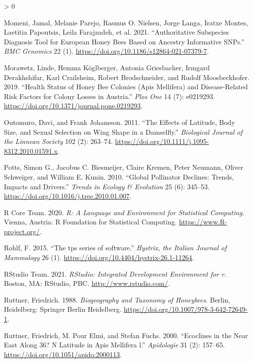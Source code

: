 \documentclass[
]{article}
\newlength{\cslhangindent}
\newenvironment{CSLReferences}[2] %
 {%
  \setlength{\parindent}{0pt}
  \ifodd #1 \everypar{\setlength{\hangindent}{\cslhangindent}}\ignorespaces\fi
  \ifnum #2 > 0
  \setlength{\parskip}{#2\baselineskip}
  \fi
 }%
 {}
\begin{document}
\begin{CSLReferences}{1}{0}
\leavevmode\hypertarget{ref-momeni2021}{}%
Momeni, Jamal, Melanie Parejo, Rasmus O. Nielsen, Jorge Langa, Iratxe Montes, Laetitia Papoutsis, Leila Farajzadeh, et al. 2021. {``Authoritative Subspecies Diagnosis Tool for European Honey Bees Based on Ancestry Informative SNPs.''} \emph{BMC Genomics} 22 (1). \url{https://doi.org/10.1186/s12864-021-07379-7}.

\leavevmode\hypertarget{ref-morawetz2019}{}%
Morawetz, Linde, Hemma Köglberger, Antonia Griesbacher, Irmgard Derakhshifar, Karl Crailsheim, Robert Brodschneider, and Rudolf Moosbeckhofer. 2019. {``Health Status of Honey Bee Colonies (Apis Mellifera) and Disease-Related Risk Factors for Colony Losses in Austria.''} \emph{Plos One} 14 (7): e0219293. \url{https://doi.org/10.1371/journal.pone.0219293}.

\leavevmode\hypertarget{ref-outomuro2011}{}%
Outomuro, Davi, and Frank Johansson. 2011. {``The Effects of Latitude, Body Size, and Sexual Selection on Wing Shape in a Damselfly.''} \emph{Biological Journal of the Linnean Society} 102 (2): 263--74. \url{https://doi.org/10.1111/j.1095-8312.2010.01591.x}.

\leavevmode\hypertarget{ref-potts2010}{}%
Potts, Simon G., Jacobus C. Biesmeijer, Claire Kremen, Peter Neumann, Oliver Schweiger, and William E. Kunin. 2010. {``Global Pollinator Declines: Trends, Impacts and Drivers.''} \emph{Trends in Ecology \& Evolution} 25 (6): 345--53. \url{https://doi.org/10.1016/j.tree.2010.01.007}.

\leavevmode\hypertarget{ref-r2020}{}%
R Core Team. 2020. \emph{R: A Language and Environment for Statistical Computing}. Vienna, Austria: R Foundation for Statistical Computing. \url{https://www.R-project.org/}.

\leavevmode\hypertarget{ref-rohlf2015}{}%
Rohlf, F. 2015. {``The tps series of software.''} \emph{Hystrix, the Italian Journal of Mammalogy} 26 (1). \url{https://doi.org/10.4404/hystrix-26.1-11264}.

\leavevmode\hypertarget{ref-RStudio2021}{}%
RStudio Team. 2021. \emph{RStudio: Integrated Development Environment for r}. Boston, MA: RStudio, PBC. \url{http://www.rstudio.com/}.

\leavevmode\hypertarget{ref-ruttner1988}{}%
Ruttner, Friedrich. 1988. \emph{Biogeography and Taxonomy of Honeybees}. Berlin, Heidelberg: Springer Berlin Heidelberg. \url{https://doi.org/10.1007/978-3-642-72649-1}.

\leavevmode\hypertarget{ref-ruttner2000}{}%
Ruttner, Friedrich, M. Pour Elmi, and Stefan Fuchs. 2000. {``Ecoclines in the Near East Along 36? N Latitude in Apis Mellifera l.''} \emph{Apidologie} 31 (2): 157--65. \url{https://doi.org/10.1051/apido:2000113}.


\end{CSLReferences}
\end{document}
